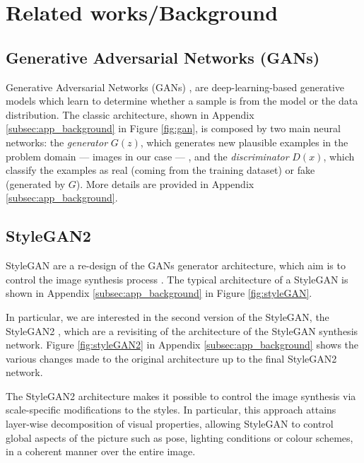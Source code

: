 \documentclass{article}
\begin{document}

	\section{Related works/Background}	
	
	\subsection{Generative Adversarial Networks (GANs)}\label{sec:gan}
	Generative Adversarial Networks (GANs) \cite{goodfellow2014generative}, are deep-learning-based 
	generative models which learn to determine whether a sample is from the model or the data 
	distribution. 
	The classic architecture, shown in Appendix \ref{subsec:app_background} in Figure 
	\ref{fig:gan}, is 
	composed by two main neural networks: 
	the \textit{generator} ${G(z)}$, which generates new plausible examples in the problem domain — 
	images in our case — , and the \textit{discriminator} ${D(x)}$, which classify the examples as 
	real (coming from the training dataset) or fake (generated by $G$). More details are provided in 
	Appendix \ref{subsec:app_background}.
	
	\subsection{StyleGAN2}\label{sec:stylegan}
	StyleGAN are a re-design of the GANs generator architecture, which aim is to control the image 
	synthesis process \cite{karras2019style}. The typical architecture of a StyleGAN is shown in 
	Appendix \ref{subsec:app_background} in Figure \ref{fig:styleGAN}.
	
	In particular, we are interested in the second version of the StyleGAN, the StyleGAN2 
	\cite{karras2020analyzing}, which are a revisiting of the architecture of the StyleGAN synthesis 
	network. Figure \ref{fig:styleGAN2} in Appendix \ref{subsec:app_background} shows the 
	various 
	changes made to the original architecture up to the final StyleGAN2 network.
	 
	The StyleGAN2 architecture makes it possible to control the image synthesis via scale-specific 
	modifications to the styles. In particular, this approach attains layer-wise decomposition of visual 
	properties, allowing StyleGAN to control global aspects of the picture such as pose, lighting 
	conditions or colour schemes, in a coherent manner over the entire image.
	
\end{document}
